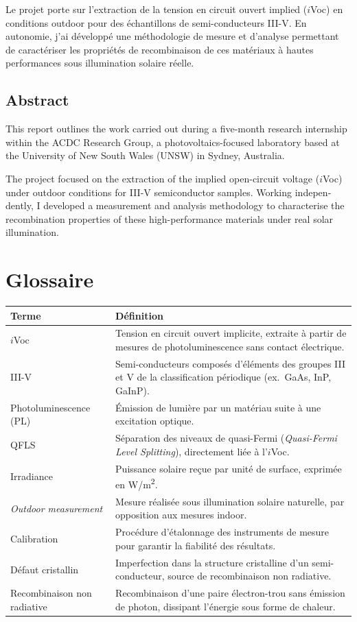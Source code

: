 \documentclass[12pt,a4paper]{report}
\begin{document}
Le projet porte sur l'extraction de la tension en circuit ouvert implied ($i$Voc) en conditions outdoor pour des échantillons de semi-conducteurs III-V. En autonomie, j'ai développé une méthodologie de mesure et d'analyse permettant de caractériser les propriétés de recombinaison de ces matériaux à hautes performances sous illumination solaire réelle.

\bigskip
\begin{otherlanguage}{english}
\section*{Abstract}
This report outlines the work carried out during a five-month research internship within the ACDC Research Group, a photovoltaics-focused laboratory based at the University of New South Wales (UNSW) in Sydney, Australia.

The project focused on the extraction of the implied open-circuit voltage ($i$Voc) under outdoor conditions for III-V semiconductor samples. Working independently, I developed a measurement and analysis methodology to characterise the recombination properties of these high-performance materials under real solar illumination.
\end{otherlanguage}

\chapter*{Glossaire}

\begin{tabularx}{\textwidth}{lX}
\toprule
\textbf{Terme} & \textbf{Définition} \\
\midrule
$i$Voc & Tension en circuit ouvert implicite, extraite à partir de mesures de photoluminescence sans contact électrique. \\[4pt]
III-V & Semi-conducteurs composés d'éléments des groupes III et V de la classification périodique (ex.\ GaAs, InP, GaInP). \\[4pt]
Photoluminescence (PL) & Émission de lumière par un matériau suite à une excitation optique. \\[4pt]
QFLS & Séparation des niveaux de quasi-Fermi (\textit{Quasi-Fermi Level Splitting}), directement liée à l'$i$Voc. \\[4pt]
Irradiance & Puissance solaire reçue par unité de surface, exprimée en \si{W/m^2}. \\[4pt]
\textit{Outdoor measurement} & Mesure réalisée sous illumination solaire naturelle, par opposition aux mesures indoor. \\[4pt]
Calibration & Procédure d'étalonnage des instruments de mesure pour garantir la fiabilité des résultats. \\[4pt]
Défaut cristallin & Imperfection dans la structure cristalline d'un semi-conducteur, source de recombinaison non radiative. \\[4pt]
Recombinaison non radiative & Recombinaison d'une paire électron-trou sans émission de photon, dissipant l'énergie sous forme de chaleur. \\
\bottomrule
\end{tabularx}
\end{document}

